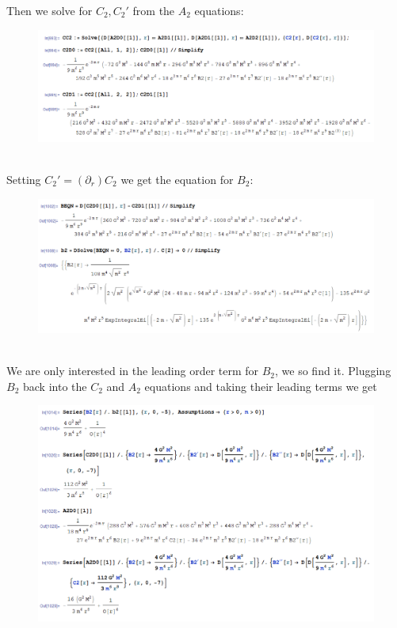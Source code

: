 \documentclass{book}
\theoremstyle{definition}
\newcommand{\p}{\partial}
\begin{document}
\newpage
Then we solve for $C_2, C_2'$ from the $A_2$ equations:
\begin{figure}[!htb]
	\centering
	\includegraphics[scale=0.2]{C2}
\end{figure}\\


Setting $C_2' = (\p_r)C_2$ we get the equation for $B_2$:
\begin{figure}[!htb]
	\centering
	\includegraphics[scale=0.17]{B2_new}
\end{figure}\\





We are only interested in the leading order term for $B_2$, we so find it. Plugging $B_2$ back into the $C_2$ and $A_2$ equations and taking their leading terms we get
\begin{figure}[!htb]
	\centering
	\includegraphics[scale=0.17]{A2B2C2}
\end{figure}\\
\end{document}
